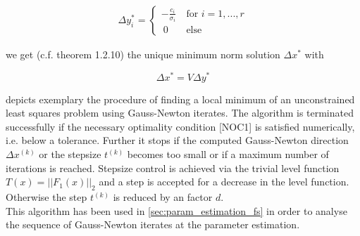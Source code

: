 \documentclass{scrartcl}[12pt, halfparskip]
\numberwithin{equation}{section}
\numberwithin{figure}{section}
\numberwithin{table}{section}
\begin{document}
\begin{itemize}
	\begin{align}
		\Delta y_i^* = 
		\begin{cases}
			- \frac{c_i}{\sigma_i} \ & \text{for } i=1,...,r \\
			\ 0 \ & \text{else}
		\end{cases}
	\end{align}
	
	we get (c.f. \cite{numerical_methods_lsq_Bjorck} theorem 1.2.10) the unique minimum norm solution  $\Delta x^*$ with
	
	\begin{equation}
		\Delta x^* = V \Delta y^*
	\end{equation}


\end{itemize}

\vspace{0.5cm}
 depicts exemplary the procedure of finding a local minimum of an unconstrained least squares problem using Gauss-Newton iterates. The algorithm is terminated successfully if the necessary optimality condition [NOC1] is satisfied numerically, i.e. below a tolerance. Further it stops if the computed Gauss-Newton direction $\Delta x^{(k)}$ or the stepsize $t^{(k)}$ becomes too small or if a maximum number of iterations is reached. Stepsize control is achieved via the trivial level function $T(x) = ||F_1(x)||_2$ and a step is accepted for a decrease in the level function. Otherwise the step $t^{(k)}$ is reduced by an factor $d$. \\
This algorithm has been used in \cref{sec:param_estimation_fs} in order to analyse the sequence of Gauss-Newton iterates at the parameter estimation.  \\
\end{document}
